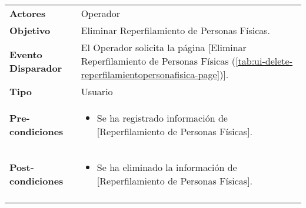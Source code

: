 	\begin{tabular}{ p{3.5cm} p{11.5cm} }
		\textbf{Actores} & Operador\\
		\textbf{Objetivo} & Eliminar Reperfilamiento de Personas F\'isicas.\\
		\textbf{Evento Disparador} & El Operador solicita la p\'agina [Eliminar Reperfilamiento de Personas F\'isicas (\ref{tab:ui-delete-reperfilamientopersonafisica-page})].\\
		\textbf{Tipo} & Usuario\\
		\textbf{Pre-condiciones} &
			\begin{minipage}[t]{0.6\textwidth}
			\begin{itemize}[noitemsep,nolistsep]
			\setlength{\itemindent}{-.5cm}
				\item Se ha registrado informaci\'on de [Reperfilamiento de Personas F\'isicas].
			\end{itemize}
			\end{minipage} \\
		\textbf{Post-condiciones} &
			\begin{minipage}[t]{0.6\textwidth}
			\begin{itemize}[noitemsep,nolistsep]
			\setlength{\itemindent}{-.5cm}
				\item Se ha eliminado la informaci\'on de [Reperfilamiento de Personas F\'isicas].
			\end{itemize}
			\end{minipage} \\
		\\
	\end{tabular}
	
